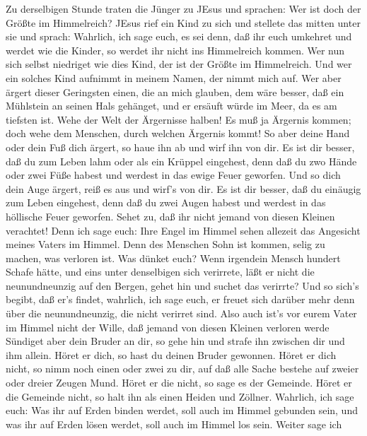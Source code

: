  Zu derselbigen Stunde traten die Jünger zu JEsus und
sprachen: Wer ist doch der Größte im Himmelreich?  JEsus
rief ein Kind zu sich und stellete das mitten unter sie  und
sprach: Wahrlich, ich sage euch, es sei denn, daß ihr euch umkehret und
werdet wie die Kinder, so werdet ihr nicht ins Himmelreich kommen.
 Wer nun sich selbst niedriget wie dies Kind, der ist der
Größte im Himmelreich.  Und wer ein solches Kind aufnimmt in
meinem Namen, der nimmt mich auf.  Wer aber ärgert dieser
Geringsten einen, die an mich glauben, dem wäre besser, daß ein
Mühlstein an seinen Hals gehänget, und er ersäuft würde im Meer, da es
am tiefsten ist.  Wehe der Welt der Ärgernisse halben! Es
muß ja Ärgernis kommen; doch wehe dem Menschen, durch welchen Ärgernis
kommt!  So aber deine Hand oder dein Fuß dich ärgert, so
haue ihn ab und wirf ihn von dir. Es ist dir besser, daß du zum Leben
lahm oder als ein Krüppel eingehest, denn daß du zwo Hände oder zwei
Füße habest und werdest in das ewige Feuer geworfen.  Und so
dich dein Auge ärgert, reiß es aus und wirf's von dir. Es ist dir
besser, daß du einäugig zum Leben eingehest, denn daß du zwei Augen
habest und werdest in das höllische Feuer geworfen.  Sehet
zu, daß ihr nicht jemand von diesen Kleinen verachtet! Denn ich sage
euch: Ihre Engel im Himmel sehen allezeit das Angesicht meines Vaters im
Himmel.  Denn des Menschen Sohn ist kommen, selig zu
machen, was verloren ist.  Was dünket euch? Wenn irgendein
Mensch hundert Schafe hätte, und eins unter denselbigen sich verirrete,
läßt er nicht die neunundneunzig auf den Bergen, gehet hin und suchet
das verirrte?  Und so sich's begibt, daß er's findet,
wahrlich, ich sage euch, er freuet sich darüber mehr denn über die
neunundneunzig, die nicht verirret sind.  Also auch ist's
vor eurem Vater im Himmel nicht der Wille, daß jemand von diesen Kleinen
verloren werde  Sündiget aber dein Bruder an dir, so gehe
hin und strafe ihn zwischen dir und ihm allein. Höret er dich, so hast
du deinen Bruder gewonnen.  Höret er dich nicht, so nimm
noch einen oder zwei zu dir, auf daß alle Sache bestehe auf zweier oder
dreier Zeugen Mund.  Höret er die nicht, so sage es der
Gemeinde. Höret er die Gemeinde nicht, so halt ihn als einen Heiden und
Zöllner.  Wahrlich, ich sage euch: Was ihr auf Erden binden
werdet, soll auch im Himmel gebunden sein, und was ihr auf Erden lösen
werdet, soll auch im Himmel los sein.  Weiter sage ich

